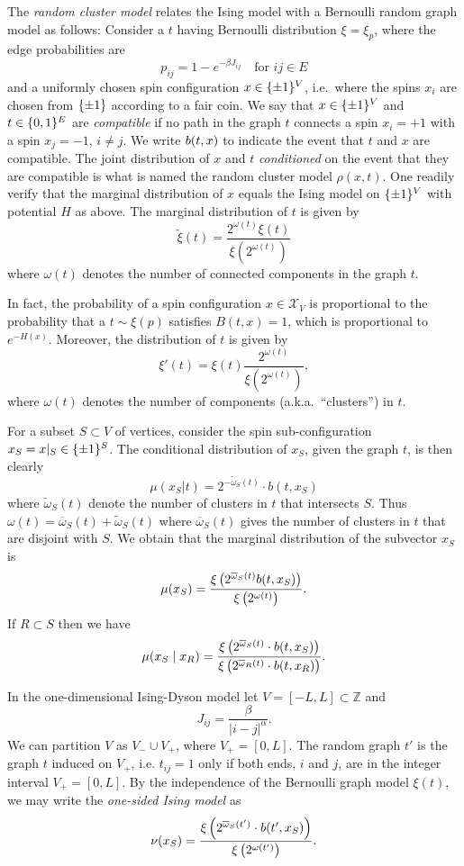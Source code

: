 \documentclass[11pt, a4paper, oneside]{article}
\theoremstyle{definition}
\theoremstyle{remark}
\providecommand{\ZZ}{\mathbb{Z}}
\providecommand{\mscr}{\mathscr}
\providecommand{\ol}{\overline}
\providecommand{\tl}{\tilde}
\def\X{\mscr X}
\begin{document}
The \emph{random cluster model} relates the Ising model with a Bernoulli random graph model as follows:
Consider a $t$ having Bernoulli distribution $\xi=\xi_p$, where the edge probabilities
are
\[ p_{ij} = 1 - e^{-\beta J_{ij}} \quad \text{for $ij\in E$}\] and a uniformly
chosen spin configuration $x\in\{\pm1\}^V$, i.e.\ where the spins $x_i$ are chosen
from $\{\pm1\}$ according to a fair coin. We say that $x\in \{\pm1\}^V$ and $t\in\{0,1\}^E$
are \emph{compatible} if no path in the graph $t$ connects a spin $x_i=+1$ with
a spin $x_j=-1$, $i\not=j$. We write $b(t,x)$ to indicate the event that $t$
and $x$ are compatible. The joint distribution of $x$ and $t$ \emph{conditioned}
on the event that they are compatible is what is named the random cluster model
$\rho(x,t)$. One readily verify that the marginal distribution of $x$ equals the
Ising model on $\{\pm1\}^V$ with potential $H$ as above. The marginal distribution of
$t$ is given by
\[
  \tl\xi(t) = \frac{2^{\omega(t)}\xi(t)}{\xi(2^{\omega(t)})}
\]
where $\omega(t)$ denotes the number of connected components in the graph $t$.

In fact, the probability of a spin configuration $x\in\X_V$ is
proportional to the probability that a $t\sim\xi(p)$ satisfies $B(t,x)=1$, which
is proportional to $e^{-H(x)}$. Moreover, the distribution of $t$ is given by
\[
  \xi'( t ) = \xi(t) \frac{2^{\omega(t)}}{\xi(2^{\omega(t)})},
\]
where $\omega(t)$ denotes the number of components (a.k.a.~``clusters'') in $t$.

For a subset $S\subset V$ of vertices, consider the spin sub-configuration $x_S=
x\vert_{S}\in\{\pm1\}^S$. The conditional distribution of $x_S$, given the graph $t$,
is then clearly
\[ \mu(x_S|t) = 2^{-\tl\omega_S(t)} \cdot b(t,x_S)\] 
where $\tl\omega_S(t)$ denote the number of clusters in $t$ that intersects $S$.
Thus
\(\omega(t)=\ol\omega_S(t)+\tl\omega_S(t)\) where $\ol\omega_S(t)$ gives the
number of clusters in $t$ that are disjoint with $S$. We obtain that the
marginal distribution of the subvector $x_S$ is 
\[\mu(x_S) = \frac{\XI{ 2^{\ol\omega_S(t)} b(t,x_S)}}{\XI{2^{\omega(t)}}}. \]
If $R\subset S$ then we have
\[\mu(x_S\mid x_R) =
  \frac{\XI{2^{\ol\omega_S(t)} \cdot b(t,x_S)}}
  {\XI{2^{\ol\omega_R(t)} \cdot b(t,x_R)}}. \]

In the one-dimensional Ising-Dyson model let $V=[-L,L]\subset \ZZ$ and
\[ J_{ij} = \frac \beta{|i-j|^\alpha}.\]
We can
partition $V$ as $V_- \cup V_+$, where $V_+=[0,L]$. The random graph $t'$ is the
graph $t$ induced on $V_+$, i.e. $t_{ij}=1$ only if both ends, $i$ and $j$, are
in the integer interval $V_+=[0,L]$. By the independence of the Bernoulli graph
model $\xi(t)$, we may write the \emph{one-sided Ising model} as
\[
  \nu(x_S) = \frac{\XI{ 2^{\ol\omega_S(t')} \cdot b(t',x_S)}}{\XI{2^{\omega(t')}}}.
\]
\end{document}
